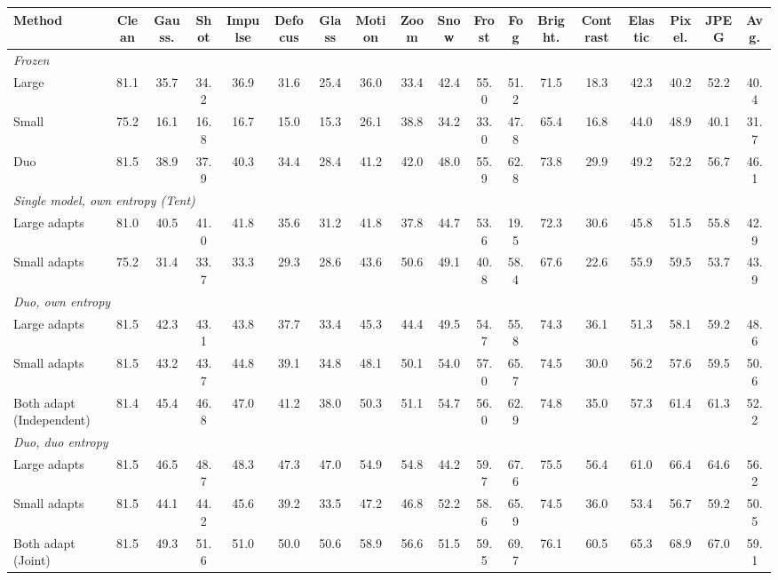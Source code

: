 \begin{table}[t]
{\begin{tabular}{l|c|ccc|cccc|cccc|cccc|c}
        \cmidrule(lr){3-5}\cmidrule(lr){6-9}\cmidrule(lr){10-13}\cmidrule(lr){14-17}
        Method & Clean & Gauss. & Shot & Impulse & Defocus & Glass & Motion & Zoom & Snow & Frost & Fog & Bright. & Contrast & Elastic & Pixel. & JPEG & Avg. \\
        \midrule
        \multicolumn{18}{l}{\textit{Frozen}} \\
        \quad Large & 81.1 & 35.7 & 34.2 & 36.9 & 31.6 & 25.4 & 36.0 & 33.4 & 42.4 & 55.0 & 51.2 & 71.5 & 18.3 & 42.3 & 40.2 & 52.2 & 40.4 \\
        \quad Small & 75.2 & 16.1 & 16.8 & 16.7 & 15.0 & 15.3 & 26.1 & 38.8 & 34.2 & 33.0 & 47.8 & 65.4 & 16.8 & 44.0 & 48.9 & 40.1 & 31.7 \\
        \quad Duo & 81.5 & 38.9 & 37.9 & 40.3 & 34.4 & 28.4 & 41.2 & 42.0 & 48.0 & 55.9 & 62.8 & 73.8 & 29.9 & 49.2 & 52.2 & 56.7 & 46.1 \\
        \midrule
        \multicolumn{18}{l}{\textit{Single model, own entropy (Tent)}} \\
        \quad Large adapts & 81.0 & 40.5 & 41.0 & 41.8 & 35.6 & 31.2 & 41.8 & 37.8 & 44.7 & 53.6 & 19.5 & 72.3 & 30.6 & 45.8 & 51.5 & 55.8 & 42.9 \\
        \quad Small adapts & 75.2 & 31.4 & 33.7 & 33.3 & 29.3 & 28.6 & 43.6 & 50.6 & 49.1 & 40.8 & 58.4 & 67.6 & 22.6 & 55.9 & 59.5 & 53.7 & 43.9 \\
        \midrule
        \multicolumn{18}{l}{\textit{Duo, own entropy}} \\
        \quad Large adapts & 81.5 & 42.3 & 43.1 & 43.8 & 37.7 & 33.4 & 45.3 & 44.4 & 49.5 & 54.7 & 55.8 & 74.3 & 36.1 & 51.3 & 58.1 & 59.2 & 48.6 \\
        \quad Small adapts & 81.5 & 43.2 & 43.7 & 44.8 & 39.1 & 34.8 & 48.1 & 50.1 & 54.0 & 57.0 & 65.7 & 74.5 & 30.0 & 56.2 & 57.6 & 59.5 & 50.6 \\
        \quad Both adapt (Independent) & 81.4 & 45.4 & 46.8 & 47.0 & 41.2 & 38.0 & 50.3 & 51.1 & 54.7 & 56.0 & 62.9 & 74.8 & 35.0 & 57.3 & 61.4 & 61.3 & 52.2 \\
        \midrule
        \multicolumn{18}{l}{\textit{Duo, duo entropy}} \\
        \quad Large adapts & 81.5 & 46.5 & 48.7 & 48.3 & 47.3 & 47.0 & 54.9 & 54.8 & 44.2 & 59.7 & 67.6 & 75.5 & 56.4 & 61.0 & 66.4 & 64.6 & 56.2 \\
        \quad Small adapts & 81.5 & 44.1 & 44.2 & 45.6 & 39.2 & 33.5 & 47.2 & 46.8 & 52.2 & 58.6 & 65.9 & 74.5 & 36.0 & 53.4 & 56.7 & 59.2 & 50.5 \\
        \quad Both adapt (Joint) & 81.5 & 49.3 & 51.6 & 51.0 & 50.0 & 50.6 & 58.9 & 56.6 & 51.5 & 59.5 & 69.7 & 76.1 & 60.5 & 65.3 & 68.9 & 67.0 & 59.1 \\
        \bottomrule
    \end{tabular}%
    }
\end{table}
